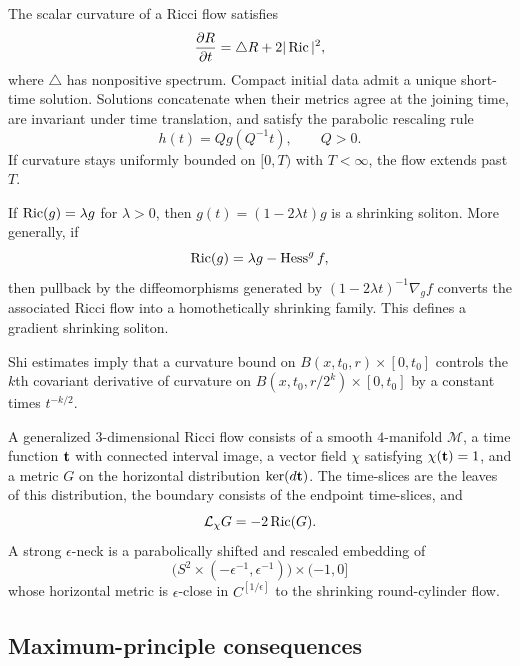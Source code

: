 The scalar curvature of a Ricci flow satisfies
\begin{equation}
\label{scalarflow}
  \frac{\partial R}{\partial t}=\triangle R+2|\operatorname{Ric}|^2,
\end{equation}
where $\triangle$ has nonpositive spectrum. Compact initial data admit a
unique short-time solution. Solutions concatenate when their metrics agree at
the joining time, are invariant under time translation, and satisfy the
parabolic rescaling rule
\[
  h(t)=Qg(Q^{-1}t),\qquad Q>0.
\]
If curvature stays uniformly bounded on $[0,T)$ with $T<\infty$, the flow
extends past $T$.

If $\operatorname{Ric}(g)=\lambda g$ for $\lambda>0$, then
$g(t)=(1-2\lambda t)g$ is a shrinking soliton. More generally, if
\[
  \operatorname{Ric}(g)=\lambda g-\operatorname{Hess}^g f,
\]
then pullback by the diffeomorphisms generated by
$(1-2\lambda t)^{-1}\nabla_g f$ converts the associated Ricci flow into a
homothetically shrinking family. This defines a gradient shrinking soliton.

Shi estimates imply that a curvature bound on
$B(x,t_0,r)\times[0,t_0]$ controls the $k$th covariant derivative of
curvature on $B(x,t_0,r/2^k)\times[0,t_0]$ by a constant times
$t^{-k/2}$.

A generalized $3$-dimensional Ricci flow consists of a smooth $4$-manifold
${\mathcal M}$, a time function ${\bf t}$ with connected interval image, a
vector field $\chi$ satisfying $\chi({\bf t})=1$, and a metric $G$ on the
horizontal distribution $\ker(d{\bf t})$. The time-slices are the leaves of
this distribution, the boundary consists of the endpoint time-slices, and
\[
  {\mathcal L}_\chi G=-2\operatorname{Ric}(G).
\]
A strong $\epsilon$-neck is a parabolically shifted and rescaled embedding of
\[
  \bigl(S^2\times(-\epsilon^{-1},\epsilon^{-1})\bigr)\times(-1,0]
\]
whose horizontal metric is $\epsilon$-close in $C^{[1/\epsilon]}$ to the
shrinking round-cylinder flow.

\subsection{Maximum-principle consequences}
\label{sectmax}

